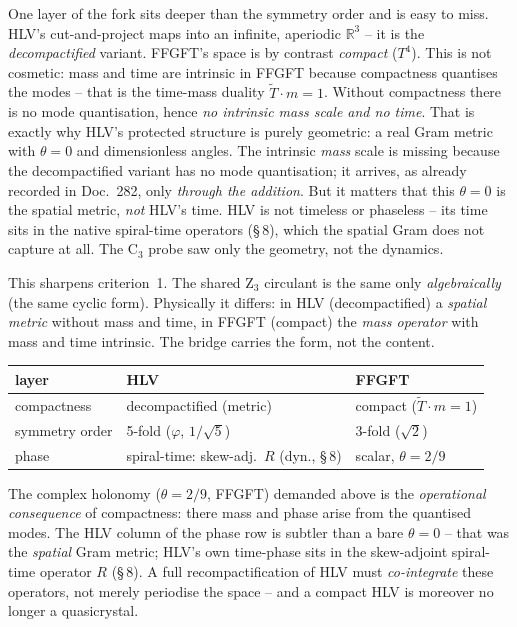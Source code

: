 One layer of the fork sits deeper than the symmetry order and is easy to miss.
HLV's cut-and-project maps into an infinite, aperiodic $\mathbb{R}^3$ -- it is the
\emph{decompactified} variant. FFGFT's space is by contrast \emph{compact}
($T^4$). This is not cosmetic: mass and time are intrinsic in FFGFT because
compactness quantises the modes -- that is the time-mass duality
$\tilde T\cdot m=1$. Without compactness there is no mode quantisation, hence
\emph{no intrinsic mass scale and no time}. That is exactly why HLV's protected
structure is purely geometric: a real Gram metric with $\theta=0$ and dimensionless
angles. The intrinsic \emph{mass} scale is missing because the decompactified
variant has no mode quantisation; it arrives, as already recorded in Doc.~282, only
\emph{through the addition}. But it matters that this $\theta=0$ is the spatial
metric, \emph{not} HLV's time. HLV is not timeless or phaseless -- its time sits in
the native spiral-time operators (§\,8), which the spatial Gram does not capture at
all. The C$_3$ probe saw only the geometry, not the dynamics.

This sharpens criterion~1. The shared Z$_3$ circulant is the same only
\emph{algebraically} (the same cyclic form). Physically it differs: in HLV
(decompactified) a \emph{spatial metric} without mass and time, in FFGFT (compact)
the \emph{mass operator} with mass and time intrinsic. The bridge carries the form,
not the content.

\begin{keyresult}
\begin{center}
\begin{tabular}{lll}
\toprule
layer & HLV & FFGFT \\
\midrule
compactness & decompactified (metric) & compact ($\tilde T\!\cdot\! m=1$) \\
symmetry order & 5-fold ($\varphi$, $1/\sqrt5$) & 3-fold ($\sqrt2$) \\
phase & spiral-time: skew-adj.\ $R$ (dyn., §\,8) & scalar, $\theta=2/9$ \\
\bottomrule
\end{tabular}
\end{center}
The complex holonomy ($\theta=2/9$, FFGFT) demanded above is the \emph{operational
consequence} of compactness: there mass and phase arise from the quantised modes.
The HLV column of the phase row is subtler than a bare $\theta=0$ -- that was the
\emph{spatial} Gram metric; HLV's own time-phase sits in the skew-adjoint
spiral-time operator $R$ (§\,8). A full recompactification of HLV must
\emph{co-integrate} these operators, not merely periodise the space -- and a compact
HLV is moreover no longer a quasicrystal.
\end{keyresult}

